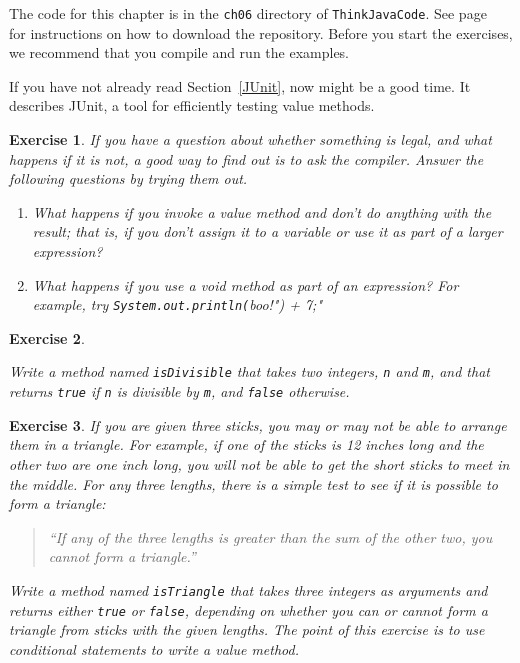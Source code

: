 \documentclass[12pt]{book}
\theoremstyle{exercise}
\newtheorem{exercise}{Exercise}[chapter]
\newcommand{\java}[1]{\verb"#1"}
\begin{document}
The code for this chapter is in the {\tt ch06} directory of {\tt ThinkJavaCode}.
See page~\pageref{code} for instructions on how to download the repository.
Before you start the exercises, we recommend that you compile and run the examples.

If you have not already read Section~\ref{JUnit}, now might be a good time.
It describes JUnit, a tool for efficiently testing value methods.



\begin{exercise}

If you have a question about whether something is legal, and what happens if it is not, a good way to find out is to ask the compiler.
Answer the following questions by trying them out.

\begin{enumerate}

\item What happens if you invoke a value method and don't do anything with the result; that is, if you don't assign it to a variable or use it as part of a larger expression?

\item What happens if you use a void method as part of an expression?
For example, try \java{System.out.println("boo!") + 7;}


\end{enumerate}

\end{exercise}


\begin{exercise}
\label{ex.isdiv}

Write a method named \java{isDivisible} that takes two integers, \java{n} and \java{m}, and that returns \java{true} if \java{n} is divisible by \java{m}, and \java{false} otherwise.

\end{exercise}


\begin{exercise}

If you are given three sticks, you may or may not be able to arrange them in a triangle.
For example, if one of the sticks is 12 inches long and the other two are one inch long, you will not be able to get the short sticks to meet in the middle.
For any three lengths, there is a simple test to see if it is possible to form a triangle:

\begin{quote}
``If any of the three lengths is greater than the sum of the other two, you cannot form a triangle.''
\end{quote}

Write a method named \java{isTriangle} that takes three integers as arguments and returns either \java{true} or \java{false}, depending on whether you can or cannot form a triangle from sticks with the given lengths.
The point of this exercise is to use conditional statements to write a value method.

\end{exercise}
\end{document}
